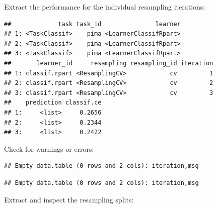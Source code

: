 \documentclass[]{article}
\newenvironment{Shaded}{\begin{snugshade}}{\end{snugshade}}
\newcommand{\KeywordTok}[1]{\textcolor[rgb]{0.13,0.29,0.53}{\textbf{#1}}}
\newcommand{\NormalTok}[1]{#1}
\newcommand{\OperatorTok}[1]{\textcolor[rgb]{0.81,0.36,0.00}{\textbf{#1}}}
\newcommand{\StringTok}[1]{\textcolor[rgb]{0.31,0.60,0.02}{#1}}
\renewenvironment{Shaded} {\begin{snugshade}\small} {\end{snugshade}}
\begin{document}
Extract the performance for the individual resampling iterations:

\begin{Shaded}
\end{Shaded}

\begin{verbatim}
##             task task_id               learner
## 1: <TaskClassif>    pima <LearnerClassifRpart>
## 2: <TaskClassif>    pima <LearnerClassifRpart>
## 3: <TaskClassif>    pima <LearnerClassifRpart>
##       learner_id     resampling resampling_id iteration
## 1: classif.rpart <ResamplingCV>            cv         1
## 2: classif.rpart <ResamplingCV>            cv         2
## 3: classif.rpart <ResamplingCV>            cv         3
##    prediction classif.ce
## 1:     <list>     0.2656
## 2:     <list>     0.2344
## 3:     <list>     0.2422
\end{verbatim}

Check for warnings or errors:

\begin{Shaded}
\end{Shaded}

\begin{verbatim}
## Empty data.table (0 rows and 2 cols): iteration,msg
\end{verbatim}

\begin{Shaded}
\end{Shaded}

\begin{verbatim}
## Empty data.table (0 rows and 2 cols): iteration,msg
\end{verbatim}

Extract and inspect the resampling splits:

\begin{Shaded}
\end{Shaded}
\end{document}
